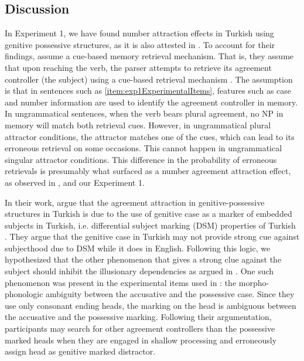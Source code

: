 \documentclass[doc,a4paper,man,natbib,floatsintext,noextraspace]{apa6}\usepackage[]{graphicx}\usepackage[]{color}
\begin{document}
\subsection{Discussion} \label{sec:exp1:discussion}

In Experiment 1, we have found number attraction effects in Turkish using genitive possessive structures, as it is also attested in \citet{LagoEtAl:2018}. To account for their findings, \citet{LagoEtAl:2018} assume a cue-based memory retrieval mechanism. That is, they assume that upon reaching the verb, the parser attempts to retrieve its agreement controller (the subject) using a cue-based retrieval mechanism \citep{LewisVasishth:2005,JagerEngelmannVasishth:2017}. The assumption is that in sentences such as \ref{item:exp1ExperimentalItems}, features such as case and number information are used to identify the agreement controller in memory. In ungrammatical sentences, when the verb bears plural agreement, no NP in memory will match both retrieval cues. However, in ungrammatical plural attractor conditions, the attractor matches one of the cues, which can lead to its erroneous retrieval on some occasions. This cannot happen in ungrammatical singular attractor conditions. This difference in the probability of erroneous retrievals is presumably what surfaced as a number agreement attraction effect, as observed in \citet{LagoEtAl:2018}, and our Experiment 1.

In their work, \citet{LagoEtAl:2018} argue that the agreement attraction in genitive-possessive structures in Turkish is due to the use of genitive case as a marker of embedded subjects in Turkish, i.e. differential subject marking (DSM) properties of Turkish \citep{kornfilt2009dom}. They argue that the genitive case in Turkish may not provide strong cue against subjecthood due to DSM while it does in English. Following this logic, we hypothesized that the other phenomenon that gives a strong clue against the subject should inhibit the illusionary dependencies as argued in \citet{nicol2016minimal}. One such phenomenon was present in the experimental items used in \citet{LagoEtAl:2018}: the morpho-phonologic ambiguity between the accusative and the possessive case. Since they use only consonant ending heads, the marking on the head is ambiguous between the accusative and the possessive marking. Following their argumentation, participants may search for other agreement controllers than the possessive marked heads when they are engaged in shallow processing and erroneously assign head as genitive marked distractor.
\end{document}
